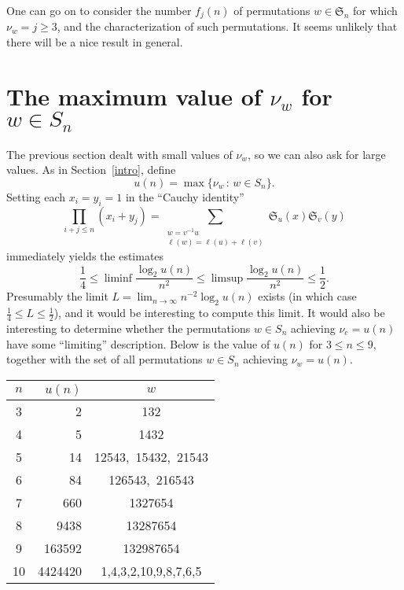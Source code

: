 \documentclass[12pt]{amsart}
\theoremstyle{definition}
\theoremstyle{remark}
\numberwithin{equation}{section}
\begin{document}
One can go on to consider the number $f_j(n)$ of permutations
$w\in{\mathfrak{S}_n}$ for which $\nu_w=j\geq 3$, and the characterization of
such permutations. It seems unlikely that there will be a nice result
in general.  

\section{The maximum value of $\nu_w$ for $w\in S_n$}
The previous section dealt with small values of $\nu_w$, so we can
also ask for large values. As in Section~\ref{intro}, define
  $$ u(n) =\max \{ \nu_w{\,:\,} w\in S_n\}. $$
Setting each $x_i=y_i=1$ in the ``Cauchy identity''
 $$ \prod_{i+j\leq n} (x_i+y_j) = \sum_{\substack{w=v^{-1}u\\
    \ell(w)=\ell(u)+\ell(v)}} {\mathfrak{S}}_u(x){\mathfrak{S}}_v(y) $$
immediately yields the estimates
   $$ \frac 14\leq\liminf \frac{\log_2 u(n)}{n^2}\leq 
   \limsup \frac{\log_2 u(n)}{n^2}\leq \frac 12. $$
Presumably the limit $L=\lim_{n\to\infty}n^{-2}\log_2 u(n)$ exists (in
which case $\frac 14\leq L\leq \frac 12$), and it would be interesting to
compute this limit. It would also be interesting to determine whether
the permutations $w\in S_n$ achieving $\nu_e=u(n)$ have some
``limiting'' description. Below is the value of $u(n)$ for $3\leq
n\leq 9$, together with the set of all permutations $w\in S_n$
achieving $\nu_w=u(n)$.

\begin{center}
 \begin{tabular}{crc}
   $n$ & $u(n)$ & $w$\\ \hline
   3 & 2 & 132\\
   4 & 5 & 1432\\
   5 & 14 & 12543,\ 15432,\ 21543\\
   6 & 84 & 126543,\ 216543\\
   7 & 660 & 1327654\\
   8 & 9438 & 13287654\\
   9 & 163592 & 132987654\\
   10 & 4424420 & 1,4,3,2,10,9,8,7,6,5
 \end{tabular}
\end{center}
 
\end{document}
